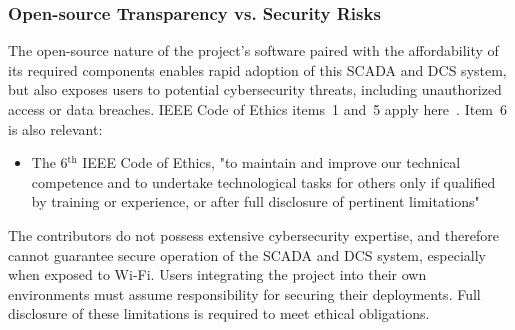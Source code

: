 \documentclass[../main.tex]{subfiles}
\begin{document}
\subsubsection{Open-source Transparency vs. Security Risks}
\par The open-source nature of the project's software paired with the affordability of its required components enables rapid adoption of this SCADA and DCS system, but also exposes users to potential cybersecurity threats, including unauthorized access or data breaches. IEEE Code of Ethics items~1 and~5 apply here~\cite{b4}. Item~6 is also relevant:
\begin{itemize}
    \item The 6$^\text{th}$ IEEE Code of Ethics, "to maintain and improve our technical competence and to undertake technological tasks for others only if qualified by training or experience, or after full disclosure of pertinent limitations"\cite{b4}
\end{itemize}
\noindent The contributors do not possess extensive cybersecurity expertise, and therefore cannot guarantee secure operation of the SCADA and DCS system, especially when exposed to Wi-Fi. Users integrating the project into their own environments must assume responsibility for securing their deployments. Full disclosure of these limitations is required to meet ethical obligations.
\end{document}
